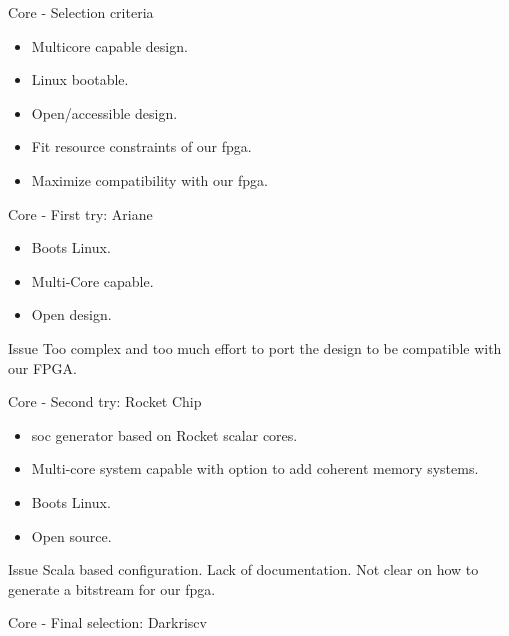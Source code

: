 \begin{frame}{Core - Selection criteria}
  \begin{itemize}
    \item Multicore capable design.
    \item Linux bootable.
    \item Open/accessible design.
    \item Fit resource constraints of our fpga. 
    \item Maximize compatibility with our fpga.
  \end{itemize}
\end{frame}

\begin{frame}{Core - First try: Ariane}
    \begin{itemize}
            \item Boots Linux.
            \item Multi-Core capable.
            \item Open design.
    \end{itemize}

    \begin{alertblock}{Issue}
            Too complex and too much effort to port the design to be compatible with our FPGA.	
    \end{alertblock}
\end{frame}

\begin{frame}{Core - Second try: Rocket Chip}
  \begin{itemize}
    \item \gls{soc} generator based on Rocket scalar cores.
    \item Multi-core system capable with option to add coherent memory systems.
    \item Boots Linux.
    \item Open source.
  \end{itemize}

  \begin{alertblock}{Issue}
    Scala based configuration. Lack of documentation. Not clear on how to generate a bitstream for our \gls{fpga}.
  \end{alertblock}
\end{frame}


\begin{frame}{Core - Final selection: Darkriscv}

\end{frame}